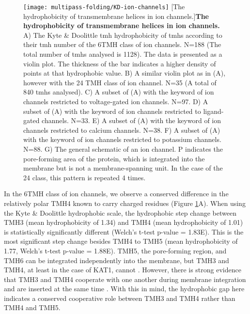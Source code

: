 \begin{figure}[!ht]
\centering
\texttt{[image: multipass-folding/KD-ion-channels]}
		[The hydrophobicity of transmembrane helices in ion channels.]{\textbf{The hydrophobicity of transmembrane helices in ion channels.}
    A) The Kyte \& Doolittle \gls{tmh} hydrophobicity of \gls{tmh}s according to their \gls{tmh} number of the 6TMH class of ion channels.
    N=188 (The total number of \gls{tmh}s analysed is 1128).
    The data is presented as a violin plot.
    The thickness of the bar indicates a higher density of points at that hydrophobic value.
    B) A similar violin plot as in (A), however with the 24 TMH class of ion channel.
    N=35 (A total of 840 \gls{tmh}s analysed).
    C) A subset of (A) with the keyword of ion channels restricted to voltage\--gated ion channels.
    N=97.
    D) A subset of (A) with the keyword of ion channels restricted to ligand\--gated channels.
    N=33.
    E) A subset of (A) with the keyword of ion channels restricted to calcium channels.
    N=38.
    F) A subset of (A) with the keyword of ion channels restricted to potassium channels.
    N=88.
    G) The general schematic of an ion channel.
    P indicates the pore\--forming area of the protein, which is integrated into the membrane but is not a membrane\--spanning unit.
    In the case of the 24 class, this pattern is repeated 4 times.
    }

\label{fig:KD-ion-channels}

\end{figure}

In the 6TMH class of ion channels, we observe a conserved difference in the relatively polar TMH4 known to carry charged residues (Figure \ref{fig:KD-ion-channels}A).
When using the Kyte \& Doolittle hydrophobic scale, the hydrophobic step change between TMH3 (mean hydrophobicity of 1.34) and TMH4 (mean hydrophobicity of 1.01) is statistically significantly different (Welch's t\--test p\--value = 1.83E).
This is the most significant step change besides TMH4 to TMH5 (mean hydrophobicity of 1.77, Welch's t\--test p\--value = 1.88E).
TMH5, the pore\--forming region, and TMH6 can be integrated independently into the membrane, but TMH3 and TMH4, at least in the case of KAT1, cannot \cite{Sato2002}.
However, there is strong evidence that TMH3 and TMH4 cooperate with one another during membrane integration and are inserted at the same time \cite{Sato2002, Sato2003, Zhang2007, Cymer2015}.
With this in mind, the hydrophobic gap here indicates a conserved cooperative role between TMH3 and TMH4 rather than TMH4 and TMH5.



